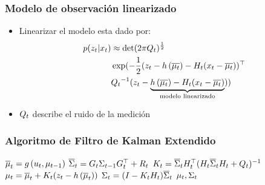 \begin{frame}
    \frametitle{Modelo de observación linearizado}
    
    \begin{itemize}
        \item Linearizar el modelo esta dado por:
        \begin{align*}
            p(z_{t} | x_{t}) &\approx \det(2 \pi Q_{t})^{\frac{1}{2}}\\
            &\exp (-\dfrac{1}{2} (z_{t} - h\left( \overline{\mu_{t}} \right) - H_{t}(x_{t} - \overline{\mu_{t}}))^{\top}\\
            &{Q_{t}}^{-1} (z_{t} - \underbrace{h\left( \overline{\mu_{t}} \right) - H_{t} (x_{t}-\overline{\mu_{t}})}_{\text{modelo linearizado}}))
        \end{align*}
        
        \item $Q_{t}$ describe el ruido de la medición
    \end{itemize}    
    
    
\end{frame}

\begin{frame}
    \frametitle{Algoritmo de Filtro de Kalman Extendido}
    
    \begin{algorithmic}[1]
        \State $\overline{\mu}_{t} = g\left( u_{t}, \mu_{t-1} \right)$
        \State $\overline{\Sigma}_{t} = G_{t} \Sigma_{t-1} G_{t}^{\top}+R_{t}$
        \Statex
        \State $K_{t} = \overline{\Sigma}_{t} H_{t}^{\top} (H_{t} \overline{\Sigma}_{t}  H_{t} + Q_{t})^{-1} $
        \State $\mu_{t} = \overline{\mu}_{t} + K_{t} (z_{t} - h\left( \overline{\mu}_{t} \right))$
        \State $\Sigma_{t} =  (I - K_{t} H_{t}) \overline{\Sigma}_{t}$
        \State \Return $\mu_{t}, \Sigma_{t}$
    \EndProcedure
    \end{algorithmic}
\end{frame}

